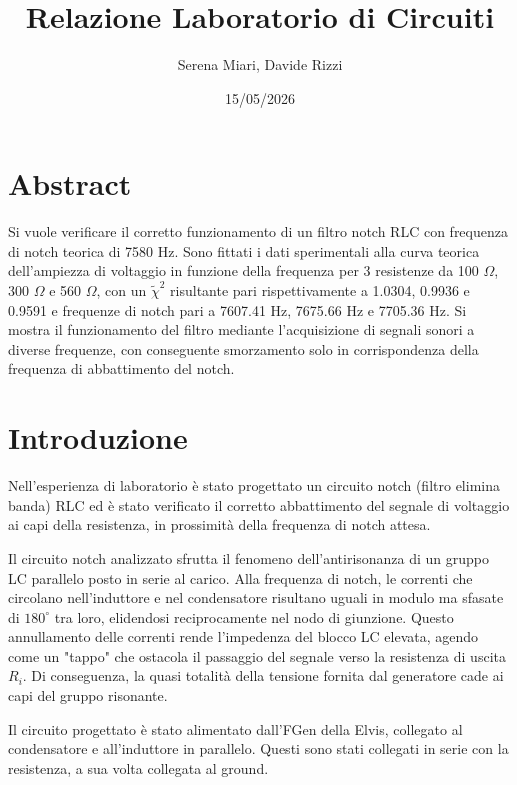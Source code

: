 \documentclass[12pt]{article}
\title{Relazione Laboratorio di Circuiti}
\author{Serena Miari, Davide Rizzi}
\date{15/05/2026}
\numberwithin{equation}{section}
\begin{document}
\maketitle

\maketitle


\section{Abstract}

Si vuole verificare il corretto funzionamento di un filtro notch RLC con frequenza di notch teorica di 7580 Hz. Sono fittati i dati sperimentali alla curva teorica dell'ampiezza di voltaggio in funzione della frequenza per 3 resistenze da 100 $\Omega$, 300 $\Omega$ e 560 $\Omega$, con un $\widetilde{\chi}^2$ risultante pari rispettivamente a 1.0304, 0.9936 e 0.9591 e frequenze di notch pari a 7607.41 Hz, 7675.66 Hz e 7705.36 Hz. Si mostra il funzionamento del filtro mediante l'acquisizione di segnali sonori a diverse frequenze, con conseguente smorzamento solo in corrispondenza della frequenza di abbattimento del notch.

\section{Introduzione}

Nell'esperienza di laboratorio è stato progettato un circuito notch (filtro elimina banda) RLC \cite{Perfetti} ed è stato verificato il corretto abbattimento del segnale di voltaggio ai capi della resistenza, in prossimità della frequenza di notch attesa. 

Il circuito notch analizzato sfrutta il fenomeno dell'antirisonanza di un gruppo LC parallelo posto in serie al carico. Alla frequenza di notch, le correnti che circolano nell'induttore e nel condensatore risultano uguali in modulo ma sfasate di $180^\circ$ tra loro, elidendosi reciprocamente nel nodo di giunzione. Questo annullamento delle correnti rende l'impedenza del blocco LC elevata, agendo come un "tappo" che ostacola il passaggio del segnale verso la resistenza di uscita $R_i$. Di conseguenza, la quasi totalità della tensione fornita dal generatore cade ai capi del gruppo risonante.

Il circuito progettato è stato alimentato dall'FGen della Elvis, collegato al condensatore e all'induttore in parallelo. Questi sono stati collegati in serie con la resistenza, a sua volta collegata al ground.
\end{document}
